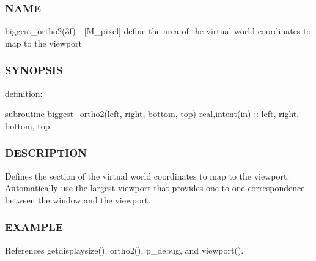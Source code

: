 \subsubsection*{N\+A\+ME}

biggest\+\_\+ortho2(3f) -\/ \mbox{[}M\+\_\+pixel\mbox{]} define the area of the virtual world coordinates to map to the viewport 

\subsubsection*{S\+Y\+N\+O\+P\+S\+IS}

definition\+:

subroutine biggest\+\_\+ortho2(left, right, bottom, top) real,intent(in) \+:\+: left, right, bottom, top

\subsubsection*{D\+E\+S\+C\+R\+I\+P\+T\+I\+ON}

Defines the section of the virtual world coordinates to map to the viewport. Automatically use the largest viewport that provides one-\/to-\/one correspondence between the window and the viewport.

\subsubsection*{E\+X\+A\+M\+P\+LE}

References getdisplaysize(), ortho2(), p\+\_\+debug, and viewport().

